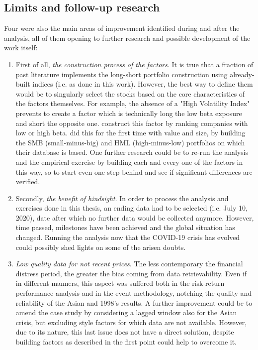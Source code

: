 \documentclass[12pt]{article}
\begin{document}
\begin{enumerate}
\end{enumerate}

\subsection{Limits and follow-up research} \label{limitations}
Four were also the main areas of improvement identified during and after the analysis, all of them opening to further research and possible development of the work itself:

\begin{enumerate}
\item First of all, \textit{the construction process of the factors}. It is true that a fraction of past literature implements the long-short portfolio construction using already-built indices (i.e. as done in this work). However, the best way to define them would be to singularly select the stocks based on the core characteristics of the factors themselves. For example, the absence of a "High Volatility Index" prevents to create a factor which is technically long the low beta exposure and short the opposite one.  construct this factor by ranking companies with low or high beta.  did this for the first time with value and size, by building the SMB (small-minus-big) and HML (high-minus-low) portfolios on which their database is based. One further research could be to re-run the analysis and the empirical exercise by building each and every one of the factors in this way, so to start even one step behind and see if significant differences are verified. 
\item Secondly, \textit{the benefit of hindsight}. In order to process the analysis and exercises done in this thesis, an ending data had to be selected (i.e. July 10, 2020), date after which no further data would be collected anymore. However, time passed, milestones have been achieved and the global situation has changed. Running the analysis now that the COVID-19 crisis has evolved could possibly shed lights on some of the arisen doubts.
\item \textit{Low quality data for not recent prices}. The less contemporary the financial distress period, the greater the bias coming from data retrievability. Even if in different manners, this aspect was suffered both in the risk-return performance analysis and in the event methodology, notching the quality and reliability of the Asian and 1998's results. A further improvement could be to amend the case study by considering a lagged window also for the Asian crisis, but excluding style factors for which data are not available. However, due to its nature, this last issue does not have a direct solution, despite building factors as described in the first point could help to overcome it.

\end{enumerate}
\end{document}
